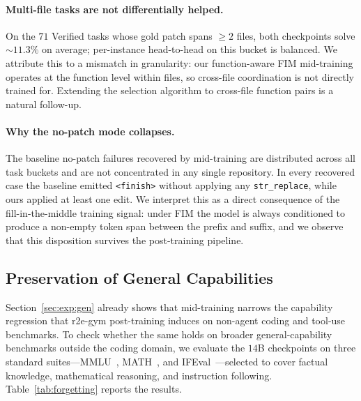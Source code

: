 \paragraph{Multi-file tasks are not differentially helped.}
On the $71$ Verified tasks whose gold patch spans $\ge 2$ files, both
checkpoints solve $\sim\!11.3\%$ on average; per-instance head-to-head on
this bucket is balanced. We attribute this to a mismatch in granularity:
our function-aware FIM mid-training operates at the function level within
files, so cross-file coordination is not directly trained for. Extending the
selection algorithm to cross-file function pairs is a natural follow-up.

\paragraph{Why the no-patch mode collapses.}
The baseline no-patch failures recovered by mid-training are distributed
across all task buckets and are not concentrated in any single repository.
In every recovered case the baseline emitted \texttt{<finish>} without
applying any \texttt{str\_replace}, while ours applied at least one edit.
We interpret this as a direct consequence of the fill-in-the-middle training
signal: under FIM the model is always conditioned to produce a non-empty
token span between the prefix and suffix, and we observe that this
disposition survives the post-training pipeline.


\subsection{Preservation of General Capabilities}
\label{sec:analysis:forgetting}

Section~\ref{sec:exp:gen} already shows that mid-training narrows the
capability regression that r2e-gym post-training induces on non-agent
coding and tool-use benchmarks. To check whether the same holds on broader
general-capability benchmarks outside the coding domain, we evaluate the
$14$B checkpoints on three standard suites---MMLU~\citep{mmlu},
MATH~\citep{mathbench}, and IFEval~\citep{ifeval}---selected to cover
factual knowledge, mathematical reasoning, and instruction following.
Table~\ref{tab:forgetting} reports the results.

